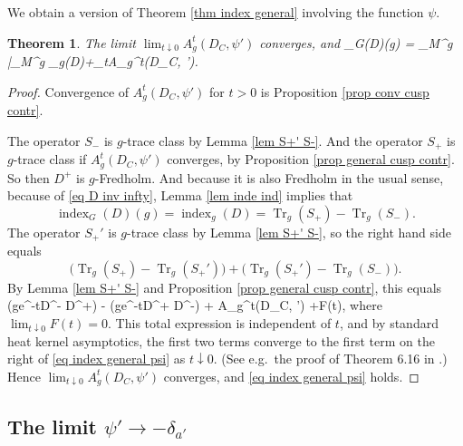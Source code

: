 \documentclass[11pt]{article}
\theoremstyle{plain}
\newtheorem{theorem}{Theorem}[section]
\theoremstyle{definition}
\theoremstyle{remark}
\numberwithin{equation}{section}
\DeclareMathOperator{\Tr}{Tr}
\DeclareMathOperator{\AS}{AS}
\DeclareMathOperator{\ind}{index}
\begin{document}
We obtain a version of Theorem \ref{thm index general} involving the function $\psi$.

\begin{theorem}\label{thm index general psi}
The limit $\lim_{t\downarrow 0}A_{g}^t(D_C, \psi')$ converges, and
\ind_G(D)(g) = \int_{M^g} \psi|_{M^g} \AS_g(D)+\lim_{t}A_{g}^t(D_C, \psi').
\eeq
\end{theorem}
\begin{proof}%
Convergence of  $A_{g}^t(D_C, \psi')$ for $t>0$ is Proposition \ref{prop conv cusp contr}.

The operator $S_-$ is $g$-trace class by Lemma \ref{lem S+' S-}. And the operator $S_+$ is $g$-trace class if $A_{g}^t(D_C, \psi')$ converges, by Proposition \ref{prop general cusp contr}. So then $D^+$ is $g$-Fredholm. And because it is also Fredholm in the usual sense, because of \eqref{eq D inv infty},  Lemma \ref{lem inde ind} implies that
\[
\ind_G(D)(g) = \ind_g(D) = \Tr_g(S_+) - \Tr_g(S_-).
\]
The operator $S_+'$ is $g$-trace class by Lemma \ref{lem S+' S-}, so the right hand side equals
\[
\bigl( \Tr_g(S_+) - \Tr_g(S_+') \bigr) + \bigl(\Tr_g(S_+')  - \Tr_g(S_-) \bigr).
\]
By Lemma \ref{lem S+' S-} and Proposition \ref{prop general cusp contr}, this equals
\Tr(g\circ e^{-t\tilde D^- \tilde D^+}\psi) -  \Tr(g\circ e^{-t\tilde D^+ \tilde D^-}\psi) + A_{g}^t(D_C, \psi') +F(t),
\eeq
where $\lim_{t\downarrow 0}F(t) = 0$. This total expression is independent of $t$, and by standard heat kernel asymptotics, the first two terms converge to the first term on the right of \eqref{eq index general psi} as $t \downarrow 0$. (See e.g.\ the proof of Theorem 6.16 in \cite{BGV}.) Hence $\lim_{t\downarrow 0} A_{g}^t(D_C, \psi')$ converges, and \eqref{eq index general psi} holds.
\end{proof}

\subsection{The limit $\psi' \to -\delta_{a'}$}
\end{document}
